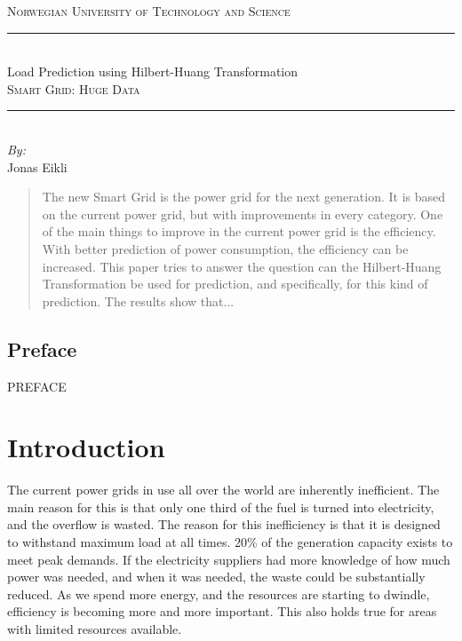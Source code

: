 \documentclass[12pt]{article}
\newcommand{\HRule}{\rule{\linewidth}{0.5mm}}
\begin{document}
\begin{titlepage}
\begin{center}
\thispagestyle{empty}

\textsc{\large Norwegian University of Technology and Science} \\

\vspace{2cm}

\HRule\\[0.5cm]
{\Huge Load Prediction using Hilbert-Huang Transformation}\\[1cm]
\textsc{\large{Smart Grid: Huge Data}}
\HRule\\[3.5cm]

\vspace{5cm}
{\large \emph{By:}}\\
Jonas Eikli\\

\vfill


\end{center}
\end{titlepage}
\newpage


\begin{abstract}
	The new Smart Grid is the power grid for the next generation. It is based on the current power grid, but with improvements in every category. One of the main things to improve in the current power grid is the efficiency. With better prediction of power consumption, the efficiency can be increased. This paper tries to answer the question can the Hilbert-Huang Transformation be used for prediction, and specifically, for this kind of prediction. The results show that...


\end{abstract}
\newpage

\subsection*{Preface}
	PREFACE




\newpage
\tableofcontents
\newpage
\listoffigures
\newpage
\listoftables
\newpage
\section{Introduction}
	\label{sec:introduction}
	
	The current power grids in use all over the world are inherently inefficient. The main reason for this is that only one third of the fuel is turned into electricity, and the overflow is wasted.  The reason for this inefficiency is that it is designed to withstand maximum load at all times. 20\% of the generation capacity exists to meet peak demands. If the electricity suppliers had more knowledge of how much power was needed, and when it was needed, the waste could be substantially reduced. As we spend more energy, and the resources are starting to dwindle, efficiency is becoming more and more important. This also holds true for areas with limited resources available.
	
\end{document}
